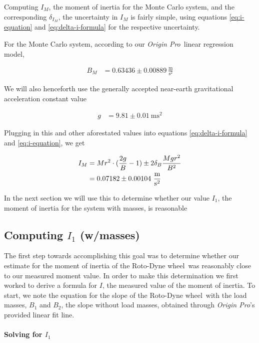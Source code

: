 \documentclass[coverpage]{article}
\newcommand{\softwareText}[1]{\textit{#1}\texttrademark}
\newcommand{\origin}{\softwareText{Origin Pro}}
\newcommand{\rwheel}{Roto-Dyne wheel}
\newcommand{\mpssq}{\frac{\text{m}}{\text{s}^2}}
\begin{document}
	Computing $I_M$, the moment of inertia for the Monte Carlo system, and the corresponding $\delta_{I_M}$, the uncertainty in $I_M$ is fairly simple, using equations \ref{eq:i-equation} and \ref{eq:delta-i-formula} for the respective uncertainty.
	
	For the Monte Carlo system, according to our \origin~linear regression model,
	
	\begin{align}
		B_M &= 0.63436 \pm 0.00889\ \mpssq
	\end{align}
	
	We will also henceforth use the generally accepted near-earth gravitational acceleration constant value
	
	\begin{align}
		g &= 9.81 \pm 0.01\ \text{m} \text{s}^2 \label{eq:def-g}
	\end{align}
	
	Plugging in this and other aforestated values into equations \ref{eq:delta-i-formula} and \ref{eq:i-equation}, we get
	
	\begin{align}
		I_M &= Mr^2 \cdot (\frac{2g}{B} - 1) \pm 2 \delta_B \frac{M g r^2}{B^2} \notag \\
		&= 0.07182 \pm 0.00104\ \mpssq
	\end{align}

	In the next section we will use this to determine whether our value $I_1$, the moment of inertia for the system with masses, is reasonable
	
	\subsection{Computing $I_1$ (w/masses)}
	
	The first step towards accomplishing this goal was to determine whether our estimate for the moment of inertia of the \rwheel~was reasonably close to our measured moment value. In order to make this determination we first worked to derive a formula for $I$, the measured value of the moment of inertia. To start, we note the equation for the slope of the \rwheel~with the load masses, $B_1$ and $B_2$, the slope without load masses, obtained through \origin's provided linear fit line.

	\newcommand{\massSlopeUncert}{\delta_B}

	\paragraph{Solving for $I_1$}
	
\end{document}
